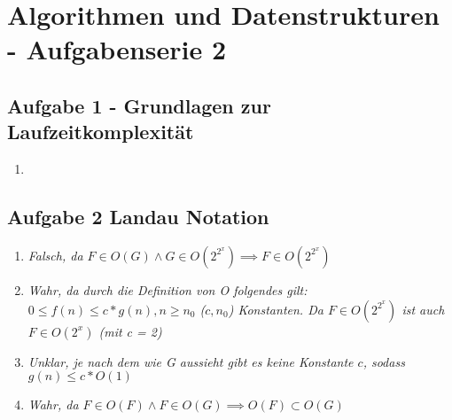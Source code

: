 \chapter*{Algorithmen und Datenstrukturen - Aufgabenserie 2}

\section*{Aufgabe 1 - Grundlagen zur Laufzeitkomplexität}
\begin{enumerate}
	\item
\end{enumerate}

\section*{Aufgabe 2  Landau Notation}
\begin{enumerate}
	\item
	\textit{Falsch, da $F \in O(G) \land G \in O(2^{2^x}) \implies F \in O(2^{2^x})$}
	\item
	\textit{Wahr, da durch die Definition von O folgendes gilt: $0 \leq f(n) \leq c*g(n), n\geq n_0$ ($c, n_0$) Konstanten. Da $F \in O(2^{2^x})$ ist auch $F \in O(2^x)$ (mit c = 2)}
	\item
	\textit{Unklar, je nach dem wie G aussieht gibt es keine Konstante $c$, sodass $g(n) \leq c * O(1)$}
	\item
	\textit{Wahr, da $F \in O(F) \land F \in O(G) \implies O(F) \subset O(G) $}
\end{enumerate}

